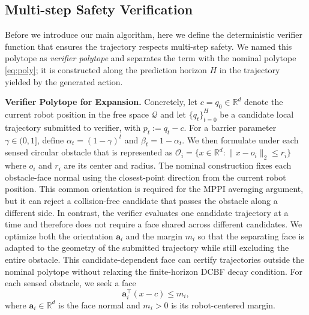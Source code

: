 \documentclass[letterpaper, 10 pt, conference]{ieeeconf}
\begin{document}

\subsection{Multi-step Safety Verification}

Before we introduce our main algorithm, here we define the deterministic verifier function that ensures the trajectory respects multi-step safety. We named this polytope as \textit{verifier polytope} and separates the term with the nominal polytope \eqref{eq:poly}; it is constructed along the prediction horizon $H$ in the trajectory yielded by the generated action. 

\noindent \textbf{Verifier Polytope for Expansion.}
Concretely, let \(c=q_0\in\mathbb R^d\) denote the current robot position in the free space \(\mathcal{Q}\) and let
\(\{q_t\}_{t=0}^{H}\) be a candidate local trajectory submitted to verifier, with
\(p_t:=q_t-c\).  For a barrier parameter \(\gamma\in(0,1]\), define
\(\alpha_t=(1-\gamma)^t\) and \(\beta_t=1-\alpha_t\). We then formulate under each sensed circular obstacle that is represented as \(\mathcal O_i=\{x\in\mathbb R^d:\|x-o_i\|_2\le r_i\}\) where \(o_i\) and \(r_i\) are its center and radius. The nominal construction fixes each obstacle-face normal using the closest-point direction from the current robot position. This common orientation is required for the MPPI averaging argument, but it can reject a collision-free candidate that passes the obstacle along a different side. In contrast, the verifier evaluates one candidate trajectory at a time and therefore does not require a face shared across different candidates. We optimize both the orientation $\mathbf a_i$ and the margin $m_i$ so that the separating face is adapted to the geometry of the submitted trajectory while still excluding the entire obstacle. This candidate-dependent face can certify trajectories outside the nominal polytope without relaxing the finite-horizon DCBF decay condition. 
For each sensed obstacle, we seek a face
\[
\mathbf a_i^\top(x-c)\le m_i,
\]
where $\mathbf a_i\in\mathbb R^d$ is the face normal and
$m_i>0$ is its robot-centered margin.
\end{document}
